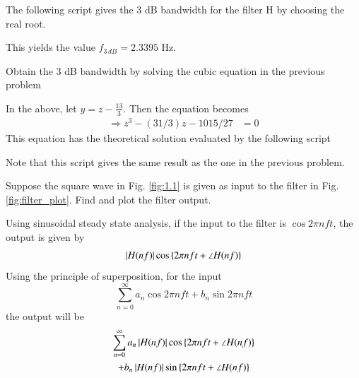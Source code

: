 %
The following script gives the 3 dB bandwidth for the filter H by choosing the 
real root.
%

%
This yields the value $f_{3\, dB} = 2.3395$ Hz.
\begin{problem}
Obtain the 3 dB bandwidth by solving the cubic equation in the previous problem
\end{problem}
%
\solution In the above, let $y = z - \frac{13}{3}$.  Then the equation becomes
\begin{align}
\Rightarrow z^3 - (31/3)z  -1015/27  & = 0
\end{align}
This equation has the theoretical solution evaluated by the following script
%

Note that this script gives the same result as the one in the previous problem.
%
\begin{problem}
\label{filter_op}
Suppose the square wave in Fig. \ref{fig:1.1} is given as input to the filter in Fig. \ref{fig:filter_plot}.  Find and plot the filter output.
\end{problem}
%
\solution  Using sinusoidal steady state analysis, if the input to the filter is
%
$\cos{2\pi n f t}$, the output is given by
\begin{equation}
\left\vert H(nf)\right\vert\cos\left\{2\pi n f t + \angle H(nf)\right\}
\end{equation}
%
Using the principle of superposition, for the input 
%
\begin{equation}
\sum_{n=0}^{\infty}a_n\cos 2\pi n f t + b_n \sin 2 \pi n f t
\end{equation}
%
the output will be
%
%
\begin{multline}
\sum_{n=0}^{\infty}a_n\left\vert H(nf)\right\vert\cos\left\{2\pi n f t + \angle H(nf)\right\} 
\\
+ b_n \left\vert H(nf)\right\vert\sin\left\{2\pi n f t + \angle H(nf)\right\}
\end{multline}
